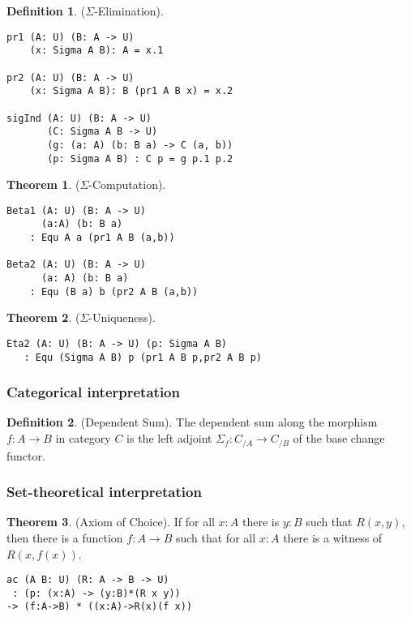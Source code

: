 \documentclass{article}
\theoremstyle{definition}
\newtheorem{theorem}{Theorem}
\newtheorem{definition}{Definition}
\begin{document}
\begin{definition} ($\Sigma$-Elimination).
\begin{lstlisting}
pr1 (A: U) (B: A -> U)
    (x: Sigma A B): A = x.1

pr2 (A: U) (B: A -> U)
    (x: Sigma A B): B (pr1 A B x) = x.2

sigInd (A: U) (B: A -> U)
       (C: Sigma A B -> U)
       (g: (a: A) (b: B a) -> C (a, b))
       (p: Sigma A B) : C p = g p.1 p.2
\end{lstlisting}
\end{definition}

\begin{theorem} ($\Sigma$-Computation).
\begin{lstlisting}
Beta1 (A: U) (B: A -> U)
      (a:A) (b: B a)
    : Equ A a (pr1 A B (a,b))

Beta2 (A: U) (B: A -> U)
      (a: A) (b: B a)
    : Equ (B a) b (pr2 A B (a,b))
\end{lstlisting}
\end{theorem}

\begin{theorem} ($\Sigma$-Uniqueness).
\begin{lstlisting}
Eta2 (A: U) (B: A -> U) (p: Sigma A B)
   : Equ (Sigma A B) p (pr1 A B p,pr2 A B p)
\end{lstlisting}
\end{theorem}

\subsubsection*{Categorical interpretation}

\begin{definition} (Dependent Sum).
The dependent sum along the morphism $f: A \rightarrow B$ in category $C$ is the left
adjoint $\Sigma_f : C_{/A} \rightarrow C_{/B}$ of the base change functor.
\end{definition}

\subsubsection*{Set-theoretical interpretation}

\begin{theorem} (Axiom of Choice).
If for all $x : A$ there is $y : B$ such that $R(x,y)$,
then there is a function $f : A \rightarrow B$
such that for all $x : A$ there is a witness of $R(x,f(x))$.
\begin{lstlisting}
ac (A B: U) (R: A -> B -> U)
 : (p: (x:A) -> (y:B)*(R x y))
-> (f:A->B) * ((x:A)->R(x)(f x))
\end{lstlisting}
\end{theorem}
\end{document}
